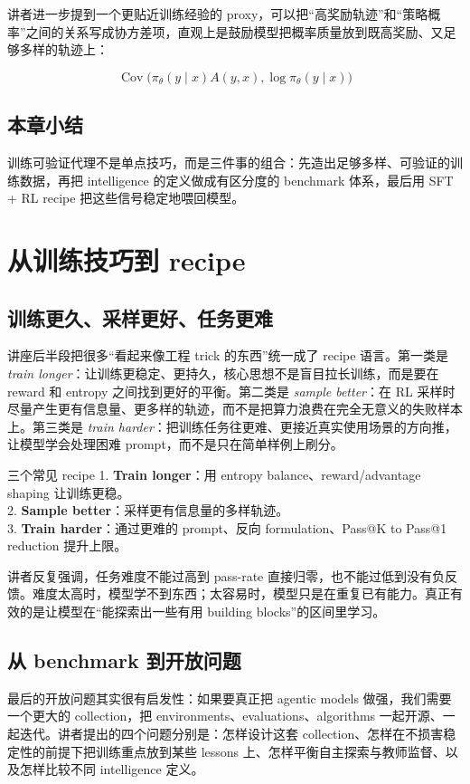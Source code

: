 \documentclass[a4paper]{article}
\begin{document}
讲者进一步提到一个更贴近训练经验的 proxy，可以把“高奖励轨迹”和“策略概率”之间的关系写成协方差项，直观上是鼓励模型把概率质量放到既高奖励、又足够多样的轨迹上：

\[
\operatorname{Cov}\!\big(\pi_{\theta}(y\mid x) A(y,x), \log \pi_{\theta}(y\mid x)\big)
\]

\subsection{本章小结}
训练可验证代理不是单点技巧，而是三件事的组合：先造出足够多样、可验证的训练数据，再把 intelligence 的定义做成有区分度的 benchmark 体系，最后用 SFT + RL recipe 把这些信号稳定地喂回模型。

\section{从训练技巧到 recipe}
\subsection{训练更久、采样更好、任务更难}
讲座后半段把很多“看起来像工程 trick 的东西”统一成了 recipe 语言。第一类是 \emph{train longer}：让训练更稳定、更持久，核心思想不是盲目拉长训练，而是要在 reward 和 entropy 之间找到更好的平衡。第二类是 \emph{sample better}：在 RL 采样时尽量产生更有信息量、更多样的轨迹，而不是把算力浪费在完全无意义的失败样本上。第三类是 \emph{train harder}：把训练任务往更难、更接近真实使用场景的方向推，让模型学会处理困难 prompt，而不是只在简单样例上刷分。

\begin{importantbox}{三个常见 recipe}
1. \textbf{Train longer}：用 entropy balance、reward/advantage shaping 让训练更稳。\\
2. \textbf{Sample better}：采样更有信息量的多样轨迹。\\
3. \textbf{Train harder}：通过更难的 prompt、反向 formulation、Pass@K to Pass@1 reduction 提升上限。
\end{importantbox}

讲者反复强调，任务难度不能过高到 pass-rate 直接归零，也不能过低到没有负反馈。难度太高时，模型学不到东西；太容易时，模型只是在重复已有能力。真正有效的是让模型在“能探索出一些有用 building blocks”的区间里学习。

\subsection{从 benchmark 到开放问题}
最后的开放问题其实很有启发性：如果要真正把 agentic models 做强，我们需要一个更大的 collection，把 environments、evaluations、algorithms 一起开源、一起迭代。讲者提出的四个问题分别是：怎样设计这套 collection、怎样在不损害稳定性的前提下把训练重点放到某些 lessons 上、怎样平衡自主探索与教师监督、以及怎样比较不同 intelligence 定义。
\end{document}
